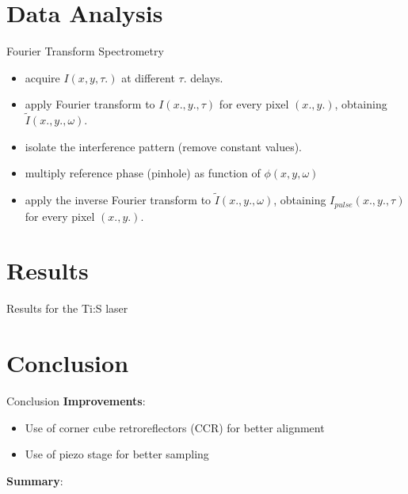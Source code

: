 \documentclass[11pt]{beamer}
\begin{document}
\section{Data Analysis}
\begin{frame}{Fourier Transform Spectrometry}
\begin{itemize}
	\item acquire $I(x,y,\tau.)$ at different $\tau.$ delays.
	\item apply Fourier transform to $I(x.,y.,\tau)$ for every pixel $(x.,y.)$, obtaining $\tilde{I}(x.,y.,\omega)$.
	\item isolate the interference pattern (remove constant values).
	\item multiply reference phase (pinhole) as function of $\phi(x,y,\omega)$
	\item apply the inverse Fourier transform to $\tilde{I}(x.,y.,\omega)$, obtaining $I_{pulse}(x.,y.,\tau)$ for every pixel $(x.,y.)$.
\end{itemize}

\end{frame}
\section{Results}
\begin{frame}{Results for the Ti:S laser}

\end{frame}
\section{Conclusion}
\begin{frame}{Conclusion}
\textbf{Improvements}:\\
	\begin{itemize}
		\item Use of corner cube retroreflectors (CCR) for better alignment
		\item Use of piezo stage for better sampling
	\end{itemize}
	
	\vspace{5pt}
\textbf{Summary}:\\
\end{frame}
\end{document}
